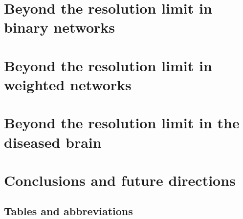 \chapter{Beyond the resolution limit in binary networks}\label{chap:beyondresolutionlimitbinarynetworks}


\chapter{Beyond the resolution limit in weighted networks}
\label{chap:beyondresolutionlimitweightednetworks}


\chapter{Beyond the resolution limit in the diseased brain}



\chapter{Conclusions and future directions}





\begin{appendices}
\chapter{Tables and abbreviations}


%
\end{appendices}


